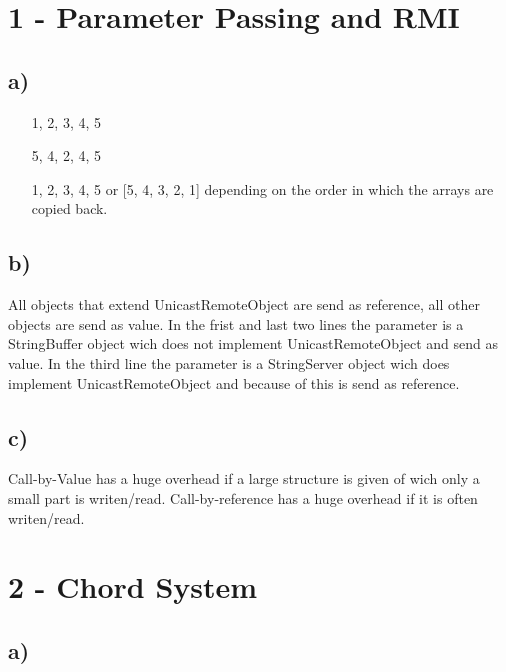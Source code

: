 \documentclass{scrartcl}
\author{Felix Bühler\\2973410 \and Clemens Lieb\\3130838 \and Steffen Wonner\\2862123 \and Fabian Bühler\\2953320}
\title{\gettitle}
\subtitle{\getsubtitle}
\begin{document}
\maketitle

\section*{1 - Parameter Passing and RMI}
\subsection*{a)}
\begin{enumerate}[label=(\roman*)]
	\item [1, 2, 3, 4, 5]
	\item [5, 4, 2, 4, 5]
	\item [1, 2, 3, 4, 5] or [5, 4, 3, 2, 1] depending on the order in which the arrays are copied back.
\end{enumerate}

\subsection*{b)}
All objects that extend UnicastRemoteObject are send as reference, all other objects are send as value.
In the frist and last two lines the parameter is a StringBuffer object wich does not implement UnicastRemoteObject and send as value. In the third line the parameter is a StringServer object wich does implement UnicastRemoteObject and because of this is send as reference.
\subsection*{c)}
Call-by-Value has a huge overhead if a large structure is given of wich only a small part is writen/read.
Call-by-reference has a huge overhead if it is often writen/read.

\section*{2 - Chord System}
\subsection*{a)}
\end{document}
